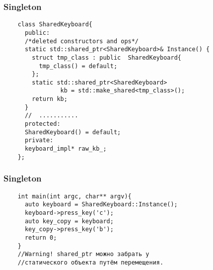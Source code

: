 \begin{frame}[fragile]
  \frametitle{Singleton}
  \begin{verbatim}
    class SharedKeyboard{
      public:
      /*deleted constructors and ops*/  
      static std::shared_ptr<SharedKeyboard>& Instance() {
        struct tmp_class : public  SharedKeyboard{
          tmp_class() = default;
        };
        static std::shared_ptr<SharedKeyboard> 
                kb = std::make_shared<tmp_class>();
        return kb;
      }
      //  ...........
      protected:
      SharedKeyboard() = default;
      private:
      keyboard_impl* raw_kb_;
    };
  \end{verbatim}
\end{frame}

\begin{frame}[fragile]
  \frametitle{Singleton}
  \begin{verbatim}
    int main(int argc, char** argv){
      auto keyboard = SharedKeyboard::Instance();
      keyboard->press_key('c');
      auto key_copy = keyboard;
      key_copy->press_key('b');
      return 0;
    }
    //Warning! shared_ptr можно забрать у 
    //статического объекта путём перемещения. 
  \end{verbatim}
\end{frame}